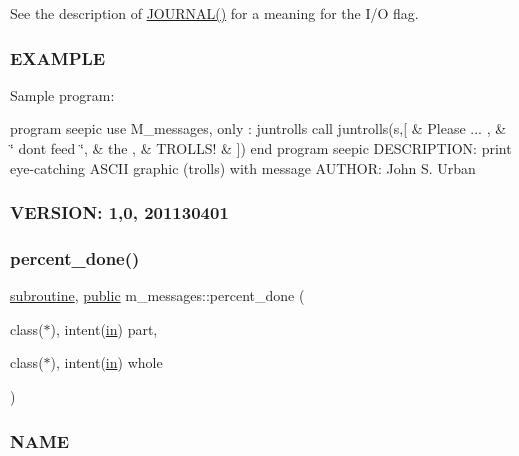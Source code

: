 See the description of \hyperlink{M__journal_83_8txt_aee6db01e1c6132b5b3f146b5a0c6e7e1}{J\+O\+U\+R\+N\+A\+L()} for a meaning for the I/O flag.

\subsubsection*{E\+X\+A\+M\+P\+LE}

Sample program\+:

program seepic use M\+\_\+messages, only \+: juntrolls call juntrolls(\textquotesingle{}s\textquotesingle{},\mbox{[} \& \textquotesingle{}Please ... \textquotesingle{}, \& \char`\"{}   don\textquotesingle{}t feed        \char`\"{}, \& \textquotesingle{} the \textquotesingle{}, \& \textquotesingle{} T\+R\+O\+L\+L\+S! \textquotesingle{} \& \mbox{]}) end program seepic D\+E\+S\+C\+R\+I\+P\+T\+I\+ON\+: print eye-\/catching A\+S\+C\+II graphic (trolls) with message A\+U\+T\+H\+OR\+: John S. Urban \subsubsection*{V\+E\+R\+S\+I\+ON\+: 1,0, 201130401}\mbox{\label{namespacem__messages_a94db4939f1beef711a49d603ba383943}} 
\subsubsection{\texorpdfstring{percent\+\_\+done()}{percent\_done()}}
{\footnotesize\ttfamily \hyperlink{M__stopwatch_83_8txt_acfbcff50169d691ff02d4a123ed70482}{subroutine}, \hyperlink{M__stopwatch_83_8txt_a2f74811300c361e53b430611a7d1769f}{public} m\+\_\+messages\+::percent\+\_\+done (\begin{DoxyParamCaption}\item[{class($\ast$), intent(\hyperlink{M__journal_83_8txt_afce72651d1eed785a2132bee863b2f38}{in})}]{part,  }\item[{class($\ast$), intent(\hyperlink{M__journal_83_8txt_afce72651d1eed785a2132bee863b2f38}{in})}]{whole }\end{DoxyParamCaption})}



\subsubsection*{N\+A\+ME}

